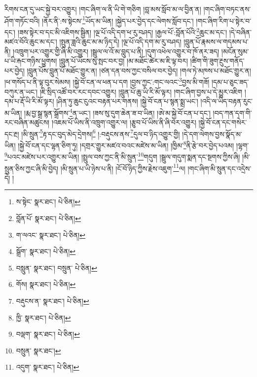 རིགས་ངན་དུ་ཡང་སྐྱེ་བར་འགྱུར། །གང་ཞིག་ལ་ནི་ཡི་གེ་གཅིག །བླ་མས་སློབ་མ་ལ་བྱིན་ན། །གང་ཞིག་བཏང་ནས་ཤོག་གཏོང་བའི། །ནོར་ནི་:ས་སྟེངས་\footnote{ས་སྟེང་  སྣར་ཐང་།  པེ་ཅིན། }ཡོད་མ་ཡིན། །སྐྱེད་པར་བྱེད་དང་ལེགས་སློབ་དང་། །གང་ཞིག་རིག་པ་སྟེར་བ་དང་། །ཟས་སྟེར་བ་དང་མི་འཇིགས་སྦྱིན། །ལྔ་པོ་འདི་དག་ཕ་རུ་བཤད། །རྒྱལ་པོ་:བློན་པོའི་\footnote{བློན་པོ་  སྣར་ཐང་།  པེ་ཅིན། }ཆུང་མ་དང་། །དེ་བཞིན་མཛའ་བོའི་ཆུང་མ་དང་། །སྤུན་ཟླའི་ཆུང་མ་མ་ཉིད་དེ། །ལྔ་པོ་འདི་དག་མ་རུ་བཤད། །བླུན་པོ་རྣམས་ལ་གདམས་པ་ནི། །འཁྲུག་པར་འགྱུར་གྱི་ཞི་མི་འགྱུར། །སྦྲུལ་ལ་འོ་མ་བླུད་པ་ནི། །དུག་འཕེལ་འགྱུར་བ་ཁོ་ནར་ཟད། །མངོན་སུམ་པ་ཡི་རྐང་གཉིས་ཕྱུགས། །བླུན་པོ་ཡོངས་སུ་སྤང་བར་བྱ། །མ་མཐོང་ཚེར་མ་ཇི་ལྟ་བར། །ཚིག་གི་ཟུག་རྔུས་གནོད་པར་བྱེད། །བླུན་པོས་བླུན་པོ་མཐོང་གྱུར་ན། །ཙན་དན་བས་ཀྱང་བསིལ་བར་བྱེད། །གལ་ཏེ་མཁས་པ་མཐོང་གྱུར་ན། །ཕ་གསོད་པ་ནི་ལྟ་བུར་སེམས། །སྐྱེ་བོ་ངན་ལ་ཕན་པ་དག །བྱས་ཀྱང་:གང་ལའང་\footnote{ག་ལའང་  སྣར་ཐང་།  པེ་ཅིན། }བྱས་མི་གཟོ། །དམ་པ་ཅུང་ཟད་བཀུར་ན་ཡང་། །ཇི་སྲིད་འཚོ་བར་རང་དབང་འགྱུར། །བླུན་པོ་ཆུ་ཡི་རི་མོ་ལྟར། །གང་ཞིག་བྱས་པ་དེ་མྱུར་འཇིག །དམ་པ་རྡོ་ཡི་རི་མོ་ལྟར། །ཤིན་ཏུ་ཆུང་ངུའང་བརྟན་པར་གནས། །སྐྱེ་བོ་ངན་པ་སྙན་སྨྲ་ཡང་། །འདི་ལ་ཡིད་བརྟན་རུང་མ་ཡིན། །རྨ་བྱ་སྒྲ་སྙན་སྒྲོགས་\footnote{སྒྲོག་  སྣར་ཐང་།  པེ་ཅིན། }ན་ཡང་། །ཟས་སུ་དུག་ཆེན་ཟ་བ་ཡིན། །ཨེ་མ་སྐྱེ་བོ་ངན་པ་དང་། །བད་ཀན་དག་གི་རང་བཞིན་མཚུངས། །འཇམ་པོ་ཡིས་ནི་འཁྲུག་འགྱུར་ལ། །རྩུབ་པོ་ཡིས་ནི་ཞི་བར་འགྱུར། །སྐྱེ་བོ་ངན་དང་གསེར་དང་རྔ། །མི་སྲུན་\footnote{བསླུན་  སྣར་ཐང་། བསྲུན་  པེ་ཅིན། }རྟ་དང་བུད་མེད་དྲེགས།\footnote{གོས།  སྣར་ཐང་།  པེ་ཅིན། } །:བརྡུངས་ནས་\footnote{བརྡུངས་ན་  སྣར་ཐང་།  པེ་ཅིན། }དུལ་བ་ཉིད་འགྱུར་གྱི། །དེ་དག་ལེགས་བྱས་སྣོད་མ་ཡིན། །སྐྱེ་བོ་ངན་དང་ལྷན་ཅིག་ཏུ། །དགྲར་གྱུར་མཛའ་བའང་མཛེས་མ་ཡིན། །ཁྱིམ་\footnote{ཁྱི་  སྣར་ཐང་།  པེ་ཅིན། }ནི་རྩེ་བར་བྱེད་པའམ། །ལྷག་\footnote{བལྡག་  སྣར་ཐང་།  པེ་ཅིན། }པའང་མཛེས་པར་འགྱུར་མ་ཡིན། །སྤྲུལ་བས་ཀྱང་ནི་མི་སྲུན་\footnote{བསྲུན་  སྣར་ཐང་། }གདུག །སྦྲུལ་གདུག་སྨན་དང་སྔགས་ཀྱིས་ཞི། །མི་སྲུན་ཅིས་ཀྱང་ཞི་མི་བྱེད། །མི་སྲུན་པ་ཡི་ཉེས་པ་ནི། །ངོ་བོ་ཉིད་ཀྱིས་རྗེས་འཇུག་\footnote{འདུག་  སྣར་ཐང་།  པེ་ཅིན། }ལ། །གང་ཞིག་མི་སྲུན་དང་འདྲེས་དེ། །
